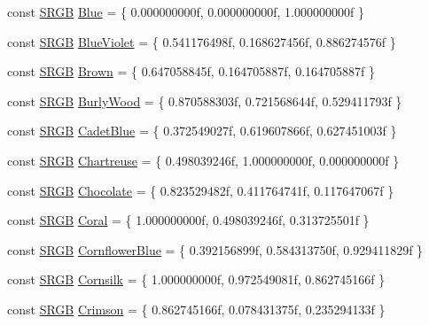 \begin{DoxyCompactItemize}
\item 
const \hyperlink{structmage_1_1_s_r_g_b}{S\+R\+GB} \hyperlink{namespacemage_1_1color_acde82252eac22aeaf6c468955610a98a}{Blue} = \{ 0.\+000000000f, 0.\+000000000f, 1.\+000000000f \}
\item 
const \hyperlink{structmage_1_1_s_r_g_b}{S\+R\+GB} \hyperlink{namespacemage_1_1color_a45f285944aae0dacfd6dddd30f3db877}{Blue\+Violet} = \{ 0.\+541176498f, 0.\+168627456f, 0.\+886274576f \}
\item 
const \hyperlink{structmage_1_1_s_r_g_b}{S\+R\+GB} \hyperlink{namespacemage_1_1color_aa40aa48abd7f6612c43fb03b024834fb}{Brown} = \{ 0.\+647058845f, 0.\+164705887f, 0.\+164705887f \}
\item 
const \hyperlink{structmage_1_1_s_r_g_b}{S\+R\+GB} \hyperlink{namespacemage_1_1color_af0e60a4c37b5d5bbf06e841846684c69}{Burly\+Wood} = \{ 0.\+870588303f, 0.\+721568644f, 0.\+529411793f \}
\item 
const \hyperlink{structmage_1_1_s_r_g_b}{S\+R\+GB} \hyperlink{namespacemage_1_1color_abf24a2bd6573f76af6a0f40af5f3c381}{Cadet\+Blue} = \{ 0.\+372549027f, 0.\+619607866f, 0.\+627451003f \}
\item 
const \hyperlink{structmage_1_1_s_r_g_b}{S\+R\+GB} \hyperlink{namespacemage_1_1color_a072c68c96e4f696ee0ced31c86e6b063}{Chartreuse} = \{ 0.\+498039246f, 1.\+000000000f, 0.\+000000000f \}
\item 
const \hyperlink{structmage_1_1_s_r_g_b}{S\+R\+GB} \hyperlink{namespacemage_1_1color_aad9f5faedbfead46c11c283abdf107af}{Chocolate} = \{ 0.\+823529482f, 0.\+411764741f, 0.\+117647067f \}
\item 
const \hyperlink{structmage_1_1_s_r_g_b}{S\+R\+GB} \hyperlink{namespacemage_1_1color_a890585ac33883ed7d67ad67b6e2c5013}{Coral} = \{ 1.\+000000000f, 0.\+498039246f, 0.\+313725501f \}
\item 
const \hyperlink{structmage_1_1_s_r_g_b}{S\+R\+GB} \hyperlink{namespacemage_1_1color_a2c406920b36ce736cfff0dbbeae97631}{Cornflower\+Blue} = \{ 0.\+392156899f, 0.\+584313750f, 0.\+929411829f \}
\item 
const \hyperlink{structmage_1_1_s_r_g_b}{S\+R\+GB} \hyperlink{namespacemage_1_1color_ab82aaa06f9beb00be579b4ec9ea61e93}{Cornsilk} = \{ 1.\+000000000f, 0.\+972549081f, 0.\+862745166f \}
\item 
const \hyperlink{structmage_1_1_s_r_g_b}{S\+R\+GB} \hyperlink{namespacemage_1_1color_afd7655203eafa71d325a42c50c9e957a}{Crimson} = \{ 0.\+862745166f, 0.\+078431375f, 0.\+235294133f \}
\item 

\end{DoxyCompactItemize}
